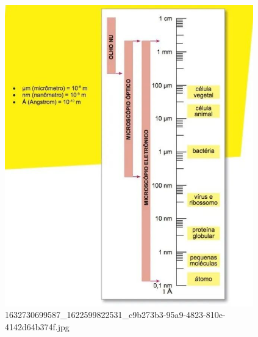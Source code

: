 \begin{escolha}
\begin{boxmedio}
\begin{boxmedio}
{\begin{boxpeq}
\begin{boxpeq}
{\begin{boxpeq}
\begin{boxmedio}
\begin{boxmedio}
\begin{boxpeq}
\begin{boxmedio}
\begin{boxpeq}
\begin{boxpeq}
\begin{boxpeq}
\begin{boxpeq}
\begin{boxmedio}
{\begin{boxmedio}
\begin{boxmedio}
\begin{boxpeq}
\begin{boxmedio}
\begin{boxpeq}
\begin{boxpeq}
\begin{boxpeq}
\begin{escolha}
{\begin{boxmedio}
\begin{boxpeq}
\begin{boxpeq}
\begin{boxpeq}
\begin{boxpeq}
\begin{boxpeq}
\begin{boxmedio}
\begin{boxpeq}
\begin{boxpeq}
\begin{boxpeq}
{\begin{boxpeq}
\begin{boxmedio}
\begin{boxpeq}
\begin{boxpeq}
\begin{boxpeq}
{\begin{boxpeq}
\begin{boxmedio}
{\begin{boxpeq}
\begin{boxpeq}
\begin{boxmedio}
\begin{boxmedio}
\begin{boxpeq}
\begin{boxpeq}
{\begin{boxpeq}
\begin{boxpeq}
\begin{boxpeq}
\begin{boxpeq}
\begin{boxpeq}
\begin{escolha}
\begin{escolha}
{\begin{boxmedio}
\begin{boxpeq}
\begin{q°}
\begin{boxmedio}
\begin{boxpeq}
\begin{boxpeq}
\begin{boxmedio}
\begin{boxmedio}
\begin{boxmedio}
\begin{boxmedio}
{\begin{enumerate}
\begin{boxpeq}
{\begin{figure}
\centering
\includegraphics[width=4.24063in,height=5.13386in]{./_SAEB_9_MAT/media/image230.jpg}
\caption{1632730699587\_1622599822531\_c9b273b3-95a9-4823-810e-4142d64b374f.jpg}

\end{figure}}
\end{boxpeq}
\end{enumerate}}
\end{boxmedio}
\end{boxmedio}
\end{boxmedio}
\end{boxmedio}
\end{boxpeq}
\end{boxpeq}
\end{boxmedio}
\end{q°}
\end{boxpeq}
\end{boxmedio}}
\end{escolha}
\end{escolha}
\end{boxpeq}
\end{boxpeq}
\end{boxpeq}
\end{boxpeq}
\end{boxpeq}}
\end{boxpeq}
\end{boxpeq}
\end{boxmedio}
\end{boxmedio}
\end{boxpeq}
\end{boxpeq}}
\end{boxmedio}
\end{boxpeq}}
\end{boxpeq}
\end{boxpeq}
\end{boxpeq}
\end{boxmedio}
\end{boxpeq}}
\end{boxpeq}
\end{boxpeq}
\end{boxpeq}
\end{boxmedio}
\end{boxpeq}
\end{boxpeq}
\end{boxpeq}
\end{boxpeq}
\end{boxpeq}
\end{boxmedio}}
\end{escolha}
\end{boxpeq}
\end{boxpeq}
\end{boxpeq}
\end{boxmedio}
\end{boxpeq}
\end{boxmedio}
\end{boxmedio}}
\end{boxmedio}
\end{boxpeq}
\end{boxpeq}
\end{boxpeq}
\end{boxpeq}
\end{boxmedio}
\end{boxpeq}
\end{boxmedio}
\end{boxmedio}
\end{boxpeq}}
\end{boxpeq}
\end{boxpeq}}
\end{boxmedio}
\end{boxmedio}
\end{escolha}
